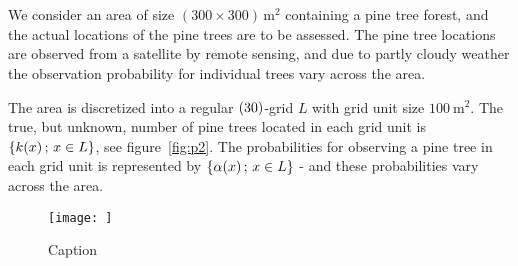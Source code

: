 \section{}
\label{sec:problem2}

We consider an area of size $(300 \times 300) \, \si{\meter^2}$ containing a pine tree forest, and the actual locations of the pine trees are to be assessed. The pine tree locations are observed from a satellite by remote sensing, and due to partly cloudy weather the observation probability for individual trees vary across the area.

The area is discretized into a regular $(30 \time 30)$-grid $L$ with grid unit size $\SI{100}{\meter^2}$. The true, but unknown, number of pine trees located in each grid unit is $\{k(x) \,;\, x \in L\}$, see figure~\ref{fig:p2}. The probabilities for observing a pine tree in each grid unit is represented by $\{\alpha(x) \,;\, x \in L\}$ - and these probabilities vary across the area.

\begin{figure}
    \centering
    \texttt{[image: ]}
    \caption{Caption}
    \label{fig:my_label}
\end{figure}
